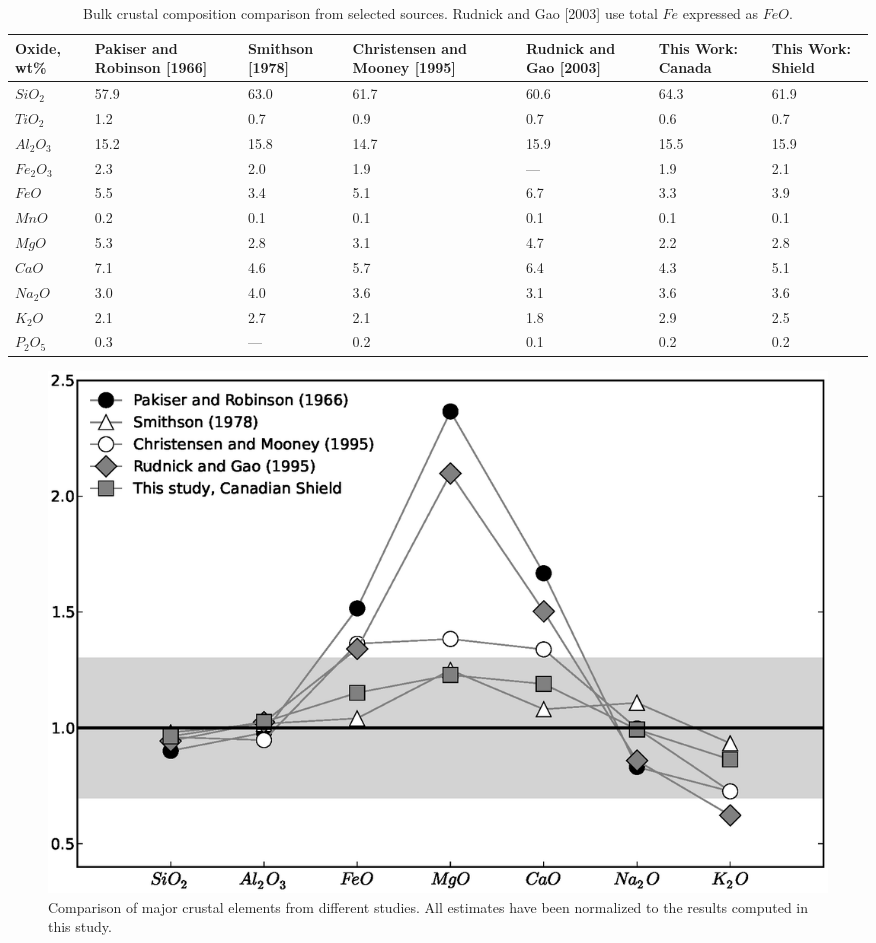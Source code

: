 \documentclass[draft, 12pt]{article}
\begin{document}
\begin{table}
  \begin{tabular}{ p{2cm} p{2cm} p{2cm} p{2cm} p{2cm} p{2cm} p{2cm}}
    \hline
    Oxide, wt\% & Pakiser and Robinson [1966] & Smithson [1978] & Christensen and Mooney [1995] & Rudnick and Gao [2003] & This Work: Canada & This Work: Shield\\
    \hline
    $SiO_2$ & 57.9 & 63.0 & 61.7 & 60.6 & 64.3 & 61.9 \\
    $TiO_2$ & 1.2 & 0.7 & 0.9 & 0.7 & 0.6 & 0.7 \\
    $Al_2O_3$ & 15.2 & 15.8 & 14.7 & 15.9 & 15.5 & 15.9 \\
    $Fe_2O_3$ & 2.3 & 2.0 & 1.9 & --- & 1.9 & 2.1 \\
    $FeO$ & 5.5 & 3.4 & 5.1 & 6.7 & 3.3 & 3.9 \\
    $MnO$ & 0.2 & 0.1 & 0.1 & 0.1 & 0.1 & 0.1 \\
    $MgO$ & 5.3 & 2.8 & 3.1 & 4.7 & 2.2 & 2.8 \\
    $CaO$ & 7.1 & 4.6 & 5.7 & 6.4 & 4.3 & 5.1 \\
    $Na_2O$ & 3.0 & 4.0 & 3.6 & 3.1 & 3.6 & 3.6 \\
    $K_2O$ & 2.1 & 2.7 & 2.1 & 1.8 & 2.9 & 2.5 \\
    $P_2O_5$ & 0.3 & --- & 0.2 & 0.1 & 0.2 & 0.2 \\
    \hline
  \end{tabular}
  \caption{Bulk crustal composition comparison from selected sources. Rudnick and Gao [2003] use total $Fe$ expressed as $FeO$.}
\label{table:composition}

\end{table}

\begin{figure}
  \centering
  \includegraphics[width=\textwidth]{composition}
  \caption{Comparison of major crustal elements from different studies. All estimates have been normalized to the results computed in this study.}
  \label{fig:composition}
\end{figure}
\end{document}
